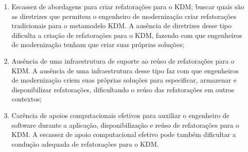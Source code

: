 \begin{enumerate}

\item Escassez de abordagens para criar refatorações para o KDM; buscar quais são as diretrizes que permitem o engenheiro de modernização criar refatorações tradicionais para o metamodelo KDM. A ausência de diretrizes desse tipo dificulta a criação de refatorações para o KDM, fazendo com que engenheiros de modernização tenham que criar suas próprias soluções;

\item Ausência de uma infraestrutura de suporte ao reúso de refatorações para o KDM. A ausência de uma infraestrutura desse tipo faz com que engenheiros de modernização criem suas próprias soluções para especificar, armazenar e disponibilizar refatorações, dificultando o reúso das refatorações em outros contextos; 






\item Carência de apoios computacionais efetivos para auxiliar o engenheiro de software durante a aplicação, disponibilização e reúso de refatorações para o KDM. A escassez de apoio computacional efetivo pode também dificultar a condução adequada de refatorações para o KDM.

\end{enumerate}

